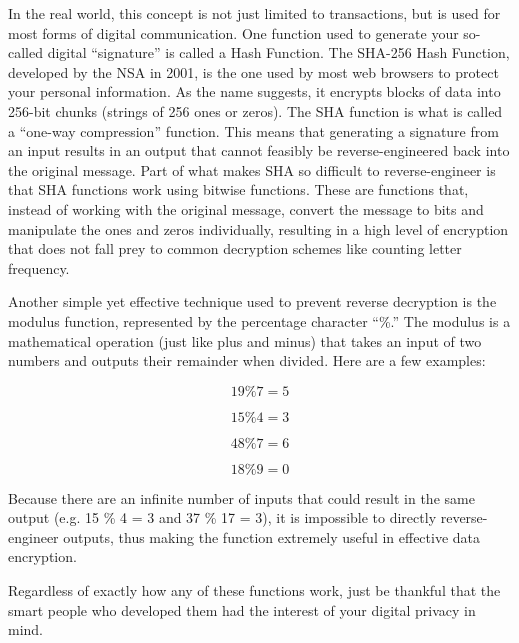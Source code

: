 In the real world, this concept is not just limited to transactions, but is used for most forms of digital communication. One function used to generate your so-called digital “signature” is called a Hash Function. The SHA-256 Hash Function, developed by the NSA in 2001, is the one used by most web browsers to protect your personal information. As the name suggests, it encrypts blocks of data into 256-bit chunks (strings of 256 ones or zeros). The SHA function is what is called a “one-way compression” function. This means that generating a signature from an input results in an output that cannot feasibly be reverse-engineered back into the original message. Part of what makes SHA so difficult to reverse-engineer is that SHA functions work using bitwise functions. These are functions that, instead of working with the original message, convert the message to bits and manipulate the ones and zeros individually, resulting in a high level of encryption that does not fall prey to common decryption schemes like counting letter frequency.

Another simple yet effective technique used to prevent reverse decryption is the modulus function, represented by the percentage character “\%.” The modulus is a mathematical operation (just like plus and minus) that takes an input of two numbers and outputs their remainder when divided. Here are a few examples:

\[19 \% 7 = 5\]

\[15 \% 4 = 3\]

\[48 \% 7 = 6\]

\[18 \% 9 = 0\]

Because there are an infinite number of inputs that could result in the same output (e.g. 15 \% 4 = 3 and 37 \% 17 = 3), it is impossible to directly reverse-engineer outputs, thus making the function extremely useful in effective data encryption.

Regardless of exactly how any of these functions work, just be thankful that the smart people who developed them had the interest of your digital privacy in mind. 



